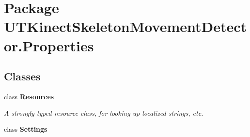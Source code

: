 \hypertarget{namespace_u_t_kinect_skeleton_movement_detector_1_1_properties}{\section{Package U\-T\-Kinect\-Skeleton\-Movement\-Detector.\-Properties}
\label{namespace_u_t_kinect_skeleton_movement_detector_1_1_properties}
}
\subsection*{Classes}
\begin{DoxyCompactItemize}
\item 
class {\bfseries Resources}
\begin{DoxyCompactList}\small\item\em A strongly-\/typed resource class, for looking up localized strings, etc. \end{DoxyCompactList}\item 
class {\bfseries Settings}
\end{DoxyCompactItemize}
